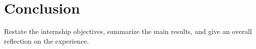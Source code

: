 \chapter{Conclusion}
Restate the internship objectives, summarize the main results, and give an overall reflection on the experience.


